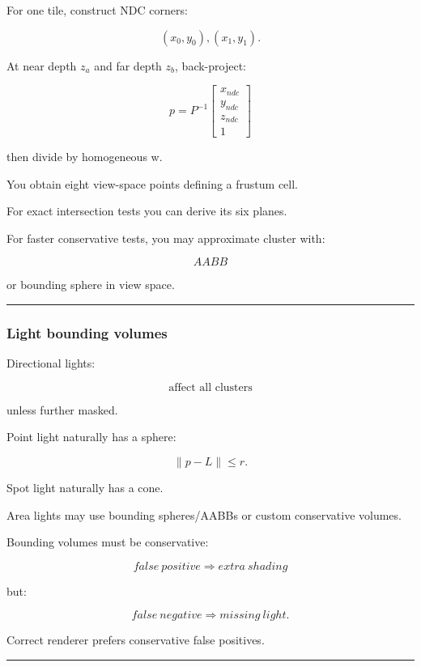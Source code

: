 For one tile, construct NDC corners:

\[
(x_0,y_0),(x_1,y_1).
\]

At near depth \(z_a\) and far depth \(z_b\), back-project:

\[
p=
P^{-1}
\begin{bmatrix}
x_{ndc}\\
y_{ndc}\\
z_{ndc}\\
1
\end{bmatrix}
\]

then divide by homogeneous w.

You obtain eight view-space points defining a frustum cell.

For exact intersection tests you can derive its six planes.

For faster conservative tests, you may approximate cluster with:

\[
AABB
\]

or bounding sphere in view space.

\begin{center}\rule{0.5\linewidth}{0.5pt}\end{center}

\subsubsection{Light bounding volumes}\label{light-bounding-volumes}

Directional lights:

\[
\boxed{\text{affect all clusters}}
\]

unless further masked.

Point light naturally has a sphere:

\[
\|p-L\|\le r.
\]

Spot light naturally has a cone.

Area lights may use bounding spheres/AABBs or custom conservative volumes.

Bounding volumes must be conservative:

\[
\boxed{
false\ positive
\Rightarrow
extra\ shading
}
\]

but:

\[
\boxed{
false\ negative
\Rightarrow
missing\ light.
}
\]

Correct renderer prefers conservative false positives.

\begin{center}\rule{0.5\linewidth}{0.5pt}\end{center}

